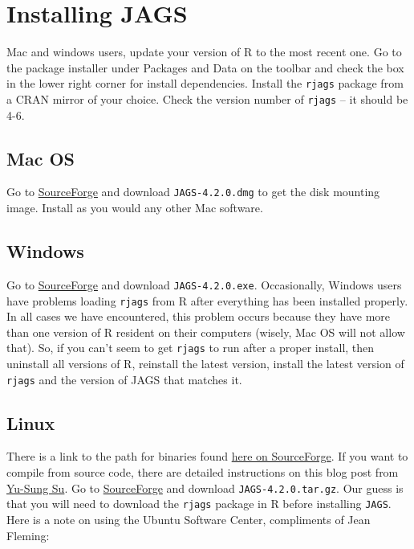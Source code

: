 \documentclass[12pt,english]{article}
\begin{document}
\section{Installing JAGS}

Mac and windows users, update your version of R to the most recent one. Go to the package installer under \textsf{Packages and Data} on the toolbar and check the box in the lower right corner for \textsf{install dependencies}. Install the \texttt{rjags} package \citep{Plummer2016rjags} from a CRAN mirror of your choice. Check the version number of \texttt{rjags} -- it should be 4-6. 

\subsection{Mac OS}

Go to \href{https://sourceforge.net/projects/mcmc-jags/files/JAGS/4.x/Mac}{SourceForge} and download \texttt{JAGS-4.2.0.dmg} to get the disk mounting image. Install as you would any other Mac software.

\subsection{Windows}

Go to \href{https://sourceforge.net/projects/mcmc-jags/files/JAGS/4.x/Windows}{SourceForge} and download \texttt{JAGS-4.2.0.exe}. Occasionally, Windows users have problems loading \texttt{rjags} from R after everything has been installed properly. In all cases we have encountered, this problem occurs because they have more than one version of R resident on their computers (wisely, Mac OS will not allow that). So, if you can't seem to get \texttt{rjags} to run after a proper install, then uninstall all versions of R, reinstall the latest version, install the latest version of \texttt{rjags} and the version of JAGS that matches it. 

\subsection{Linux}

There is a link to the path for binaries found \href{http://mcmc-jags.sourceforge.net}{here on SourceForge}. If you want to compile from source code, there are detailed instructions on this blog post from \href{http://yusung.blogspot.com/2009/01/install-jags-and-rjags-in-fedora.html}{Yu-Sung Su}. Go to \href{https://sourceforge.net/projects/mcmc-jags/files/JAGS/4.x/Source/}{SourceForge} and download \texttt{JAGS-4.2.0.tar.gz}. Our guess is that you will need to download the \texttt{rjags} package in R before installing \texttt{JAGS}. Here is a note on using the Ubuntu Software Center, compliments of Jean Fleming:
\end{document}
